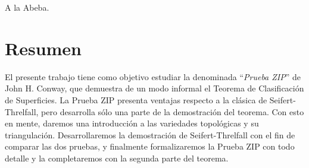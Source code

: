 \documentclass[10pt]{report}
\theoremstyle{definition}
\newcommand\blankpage{%
    \null
    \thispagestyle{empty}%
    \newpage}
\newenvironment{dedication}
  {\clearpage           %
   \thispagestyle{empty}%
   \vspace*{\stretch{1}}%
   \itshape             %
   \raggedleft          %
  }
  {\par %
   \vspace{\stretch{3}} %
   \clearpage           %
  }
\begin{document}
%

\begin{dedication}
\afterpage{\blankpage}
A la Abeba.
\end{dedication}




\section*{Resumen}

El presente trabajo tiene como objetivo estudiar la denominada ``\textit{Prueba ZIP}'' de John H. Conway, que demuestra de un modo informal el Teorema de Clasificación de Superficies. La Prueba ZIP presenta ventajas respecto a la clásica de Seifert-Threlfall, pero desarrolla sólo una parte de la demostración del teorema. Con esto en mente, daremos una introducción a las variedades topológicas y su triangulación. Desarrollaremos la demostración de Seifert-Threlfall con el fin de comparar las dos pruebas, y finalmente formalizaremos la Prueba ZIP con todo detalle y la completaremos con la segunda parte del teorema.
\end{document}
